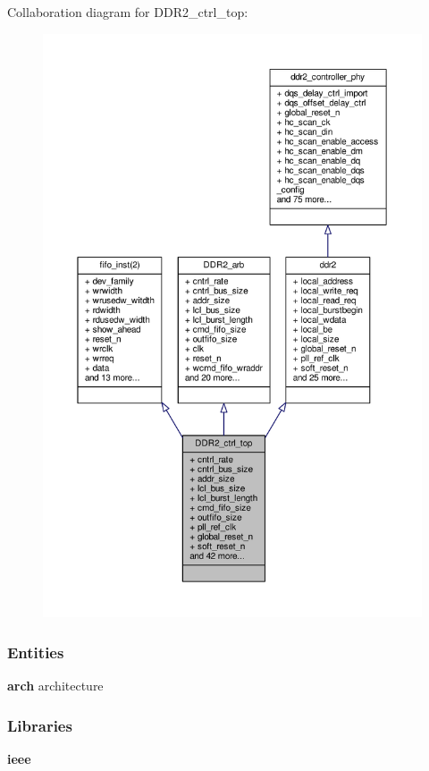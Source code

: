 Collaboration diagram for D\+D\+R2\+\_\+ctrl\+\_\+top\+:\nopagebreak
\begin{figure}[H]
\begin{center}
\leavevmode
\includegraphics[width=350pt]{dd/dd5/classDDR2__ctrl__top__coll__graph}
\end{center}
\end{figure}
\subsubsection*{Entities}
\begin{DoxyCompactItemize}
\item 
{\bf arch} architecture
\end{DoxyCompactItemize}
\subsubsection*{Libraries}
 \begin{DoxyCompactItemize}
\item 
{\bf ieee} 
\end{DoxyCompactItemize}
